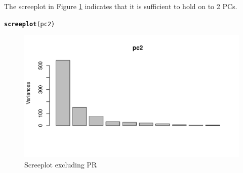 \documentclass[12pt, leqno]{article}\usepackage[]{graphicx}\usepackage[]{color}
\makeatletter
\def\maxwidth{ %
  \ifdim\Gin@nat@width>\linewidth
    \linewidth
  \else
    \Gin@nat@width
  \fi
}
\newcommand{\hlstd}[1]{\textcolor[rgb]{0.345,0.345,0.345}{#1}}%
\newcommand{\hlkwd}[1]{\textcolor[rgb]{0.737,0.353,0.396}{\textbf{#1}}}%
\newenvironment{kframe}{%
 \def\at@end@of@kframe{}%
 \ifinner\ifhmode%
  \def\at@end@of@kframe{\end{minipage}}%
  \begin{minipage}{\columnwidth}%
 \fi\fi%
 \def\FrameCommand##1{\hskip\@totalleftmargin \hskip-\fboxsep
 \colorbox{shadecolor}{##1}\hskip-\fboxsep
     \hskip-\linewidth \hskip-\@totalleftmargin \hskip\columnwidth}%
 \MakeFramed {\advance\hsize-\width
   \@totalleftmargin\z@ \linewidth\hsize
   \@setminipage}}%
 {\par\unskip\endMakeFramed%
 \at@end@of@kframe}
\newenvironment{knitrout}{}{} %
\makeatother
\begin{document}
The screeplot in Figure \ref{fig:p1d} indicates that it is sufficient to hold on to 2 PCs.
\begin{knitrout}
\color{fgcolor}\begin{kframe}
\begin{alltt}
\hlkwd{screeplot}\hlstd{(pc2)}
\end{alltt}
\end{kframe}\begin{figure}[H]
\includegraphics[width=\maxwidth]{figure/p1d-1} \caption[Screeplot excluding PR]{Screeplot excluding PR}\label{fig:p1d}
\end{figure}


\end{knitrout}
\end{document}
